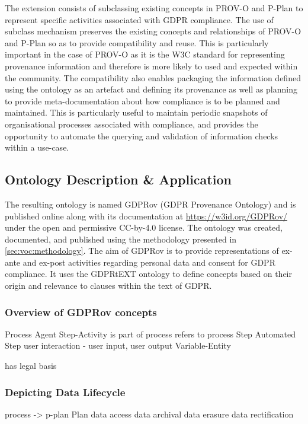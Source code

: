 The extension consists of subclassing existing concepts in PROV-O and P-Plan to represent specific activities associated with GDPR compliance. 
The use of subclass mechanism preserves the existing concepts and relationships of PROV-O and P-Plan so as to provide compatibility and reuse. This is particularly important in the case of PROV-O as it is the W3C standard for representing provenance information and therefore is more likely to used and expected within the community.
The compatibility also enables packaging the information defined using the ontology as an artefact and defining its provenance as well as planning to provide meta-documentation about how compliance is to be planned and maintained. This is particularly useful to maintain periodic snapshots of organisational processes associated with compliance, and provides the opportunity to automate the querying and validation of information checks within a use-case.

\subsection{Ontology Description \& Application}
The resulting ontology is named GDPRov (GDPR Provenance Ontology) and is published online along with its documentation at \url{https://w3id.org/GDPRov/} under the open and permissive CC-by-4.0 license.
The ontology was created, documented, and published using the methodology presented in \autoref{sec:voc:methodology}.
The aim of GDPRov is to provide representations of ex-ante and ex-post activities regarding personal data and consent for GDPR compliance.
It uses the GDPRtEXT ontology to define concepts based on their origin and relevance to clauses within the text of GDPR.

\subsubsection{Overview of GDPRov concepts}
Process
Agent
Step-Activity
    is part of process
    refers to process
Step
    Automated Step
    user interaction - user input, user output
Variable-Entity

has legal basis

\subsubsection{Depicting Data Lifecycle}
process -> p-plan Plan
    data access
    data archival
    data erasure
    data rectification

